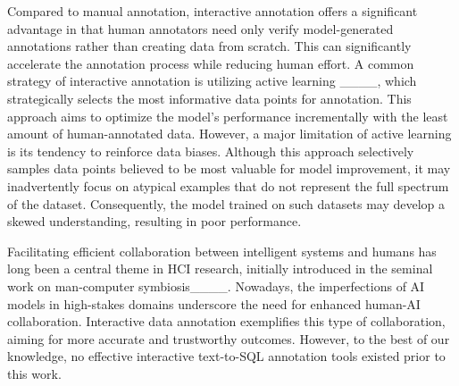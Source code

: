 Compared to manual annotation, interactive annotation offers a significant advantage in that human annotators need only verify model-generated annotations rather than creating data from scratch. This can significantly accelerate the annotation process while reducing human effort.
A common strategy of interactive annotation is utilizing active learning ____, which strategically selects the most informative data points for annotation. This approach aims to optimize the model's performance incrementally with the least amount of human-annotated data.
However, a major limitation of active learning is its tendency to reinforce data biases. Although this approach selectively samples data points believed to be most valuable for model improvement, it may inadvertently focus on atypical examples that do not represent the full spectrum of the dataset. Consequently, the model trained on such datasets may develop a skewed understanding, resulting in poor performance.

Facilitating efficient collaboration between intelligent systems and humans has long been a central theme in HCI research, initially introduced in the seminal work on man-computer symbiosis____. Nowadays, the imperfections of AI models in high-stakes domains underscore the need for enhanced human-AI collaboration. Interactive data annotation exemplifies this type of collaboration, aiming for more accurate and trustworthy outcomes. However, to the best of our knowledge, no effective interactive text-to-SQL annotation tools existed prior to this work.









